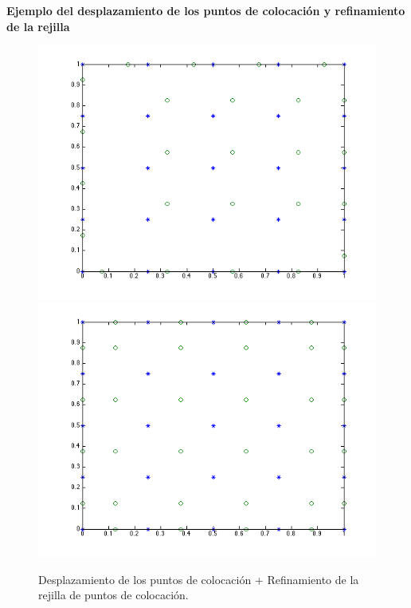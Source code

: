 \documentclass[11pt,a4paper]{article}
\begin{document}
\textbf{Ejemplo del desplazamiento de los puntos de colocación y refinamiento de la rejilla}
\begin{figure}[H]
\includegraphics[scale=.4]{desplazamiento.png}
\includegraphics[scale=.4]{refinamiento.png}
\caption{Desplazamiento de los puntos de colocación + Refinamiento de la rejilla de puntos de colocación. }
\end{figure}
\end{document}
